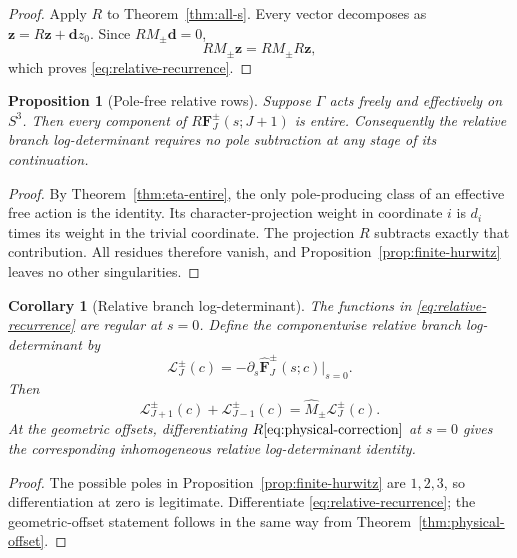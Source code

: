 \documentclass[11pt]{article}
\newtheorem{proposition}[theorem]{Proposition}
\newtheorem{corollary}[theorem]{Corollary}
\theoremstyle{definition}
\begin{document}
\begin{proof}
Apply $R$ to Theorem~\ref{thm:all-s}.  Every vector decomposes as
$\boldsymbol z=R\boldsymbol z+\boldsymbol d z_0$.  Since
$RM_\pm\boldsymbol d=0$,
\[
 RM_\pm\boldsymbol z
 =RM_\pm R\boldsymbol z,
\]
which proves \eqref{eq:relative-recurrence}.
\end{proof}

\begin{proposition}[Pole-free relative rows]
\label{prop:relative-pole-free}
Suppose $\Gamma$ acts freely and effectively on $S^3$.  Then every
component of $R\boldsymbol F_J^\pm(s;J+1)$ is entire.  Consequently
the relative branch log-determinant requires no pole subtraction at any
stage of its continuation.
\end{proposition}

\begin{proof}
By Theorem~\ref{thm:eta-entire}, the only pole-producing class of an
effective free action is the identity.  Its character-projection
weight in coordinate $i$ is $d_i$ times its weight in the trivial
coordinate.  The projection $R$ subtracts exactly that contribution.
All residues therefore vanish, and Proposition~\ref{prop:finite-hurwitz}
leaves no other singularities.
\end{proof}

\begin{corollary}[Relative branch log-determinant]
\label{cor:relative-det}
The functions in \eqref{eq:relative-recurrence} are regular at
$s=0$.  Define the componentwise relative branch log-determinant by
\begin{equation}
 \boldsymbol{\mathcal L}_J^\pm(c)
 =-\partial_s
 \widehat{\boldsymbol F}_J^\pm(s;c)\big|_{s=0}.
 \label{eq:relative-det}
\end{equation}
Then
\begin{equation}
 \boldsymbol{\mathcal L}_{J+1}^\pm(c)
 +\boldsymbol{\mathcal L}_{J-1}^\pm(c)
 =
 \widehat M_\pm\boldsymbol{\mathcal L}_J^\pm(c).
 \label{eq:relative-det-rec}
\end{equation}
At the geometric offsets, differentiating
$R\eqref{eq:physical-correction}$ at $s=0$ gives the corresponding
inhomogeneous relative log-determinant identity.
\end{corollary}

\begin{proof}
The possible poles in Proposition~\ref{prop:finite-hurwitz} are
$1,2,3$, so differentiation at zero is legitimate.  Differentiate
\eqref{eq:relative-recurrence}; the geometric-offset statement follows
in the same way from Theorem~\ref{thm:physical-offset}.
\end{proof}
\end{document}
